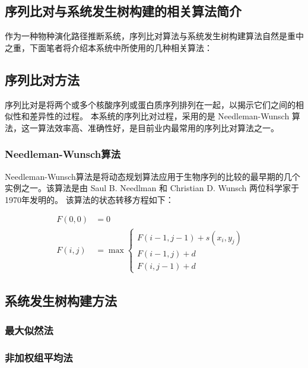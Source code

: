 \documentclass{article}
\begin{document}
\begin{multicols}{2}

\section{序列比对与系统发生树构建的相关算法简介}
\par
作为一种物种演化路径推断系统，序列比对算法与系统发生树构建算法自然是重中之重，下面笔者将介绍本系统中所使用的几种相关算法：

\subsection{序列比对方法}
\par
序列比对是将两个或多个核酸序列或蛋白质序列排列在一起，以揭示它们之间的相似性和差异性的过程。
本系统的序列比对过程，采用的是 Needleman-Wunsch 算法，这一算法效率高、准确性好，是目前业内最常用的序列比对算法之一。

\subsubsection{Needleman-Wunsch算法}
\par
Needleman-Wunsch算法是将动态规划算法应用于生物序列的比较的最早期的几个实例之一。该算法是由 Saul B. Needlman 和 Christian D. Wunsch 两位科学家于1970年发明的\cite{ref2}。
该算法的状态转移方程如下：

\begin{equation}
\begin{aligned}
F(0,0) &= 0 \\
F(i,j) &= \max \left\{
      \begin{array}{lr}
      F(i-1,j-1) + s(x_i,y_j) &  \\
      F(i-1,j)+d & \\
      F(i,j-1)+d &
      \end{array}
\right.
\nonumber
\end{aligned}
\end{equation}


\subsection{系统发生树构建方法}

\subsubsection{最大似然法}

\subsubsection{非加权组平均法}


\end{multicols}
\end{document}
